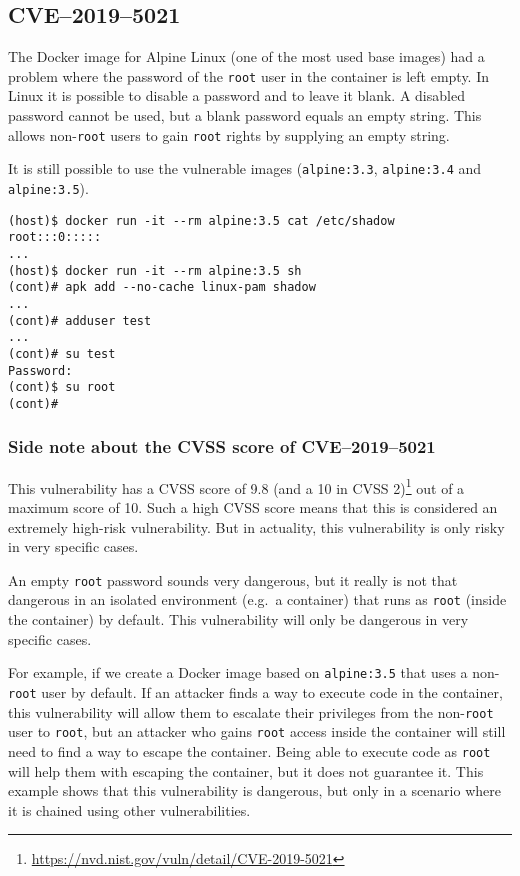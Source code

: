 \subsection{CVE--2019--5021}\label{subsection:CVE-2019-5021}
The Docker image for Alpine Linux (one of the most used base images) had a problem where the password of the \lstinline{root} user in the container is left empty. In Linux it is possible to disable a password and to leave it blank. A disabled password cannot be used, but a blank password equals an empty string. This allows non-\lstinline{root} users to gain \lstinline{root} rights by supplying an empty string.

\medskip

It is still possible to use the vulnerable images (\lstinline{alpine:3.3}, \lstinline{alpine:3.4} and \lstinline{alpine:3.5}).
\begin{lstlisting}[caption={The Docker image of Alpine Linux 3.5 has an empty password.},captionpos=b]
(host)$ docker run -it --rm alpine:3.5 cat /etc/shadow
root:::0:::::
...
(host)$ docker run -it --rm alpine:3.5 sh
(cont)# apk add --no-cache linux-pam shadow
...
(cont)# adduser test
...
(cont)# su test
Password:
(cont)$ su root
(cont)#
\end{lstlisting}

\subsubsection*{Side note about the CVSS score of CVE--2019--5021}

This vulnerability has a CVSS score of 9.8 (and a 10 in CVSS 2)\footnote{\url{https://nvd.nist.gov/vuln/detail/CVE-2019-5021}} out of a maximum score of 10. Such a high CVSS score means that this is considered an extremely high-risk vulnerability. But in actuality, this vulnerability is only risky in very specific cases.

An empty \lstinline{root} password sounds very dangerous, but it really is not that dangerous in an isolated environment (e.g.\ a container) that runs as \lstinline{root} (inside the container) by default. This vulnerability will only be dangerous in very specific cases.

For example, if we create a Docker image based on \lstinline{alpine:3.5} that uses a non-\lstinline{root} user by default. If an attacker finds a way to execute code in the container, this vulnerability will allow them to escalate their privileges from the non-\lstinline{root} user to \lstinline{root}, but an attacker who gains \lstinline{root} access inside the container will still need to find a way to escape the container. Being able to execute code as \lstinline{root} will help them with escaping the container, but it does not guarantee it. This example shows that this vulnerability is dangerous, but only in a scenario where it is chained using other vulnerabilities.
